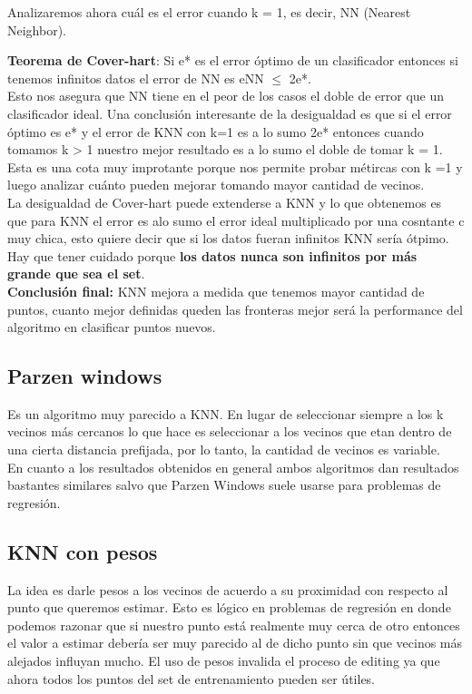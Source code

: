 \documentclass[titlepage,a4paper]{article}
\begin{document}
Analizaremos ahora cuál es el error cuando k = 1, es decir, NN (Nearest Neighbor).

\textbf{Teorema de Cover-hart}: Si e* es el error óptimo de un clasificador entonces si tenemos infinitos datos el error de NN es eNN $\leq$ 2e*. \\

Esto nos asegura que NN tiene en el peor de los casos el doble de error que un clasificador ideal. Una conclusión interesante de la desigualdad es que si el error óptimo es e* y el error de KNN con k=1 es a lo sumo 2e* entonces cuando tomamos k > 1 nuestro mejor resultado es a lo sumo el doble de tomar k = 1.   Esta es una cota muy improtante porque nos permite probar métircas con k =1 y luego analizar cuánto pueden mejorar tomando mayor cantidad de vecinos. \\

La desigualdad de Cover-hart puede extenderse a KNN y lo que obtenemos es que para KNN el error es alo sumo el error ideal multiplicado por una cosntante c muy chica, esto quiere decir que si los datos fueran infinitos KNN sería ótpimo. Hay que tener cuidado porque \textbf{los datos nunca son infinitos por más grande que sea el set}.\\

\textbf{Conclusión final:} KNN  mejora a medida que tenemos mayor cantidad de puntos, cuanto mejor definidas queden las fronteras mejor será la performance del algoritmo en clasificar puntos nuevos. \\

\subsection*{Parzen windows}
Es un algoritmo muy parecido a KNN. En lugar de seleccionar siempre a los k vecinos más cercanos lo que hace es seleccionar a los vecinos que etan dentro de una cierta distancia prefijada, por lo tanto, la cantidad de vecinos es variable. \\

En cuanto a los resultados obtenidos en general ambos algoritmos dan resultados bastantes similares salvo que Parzen Windows suele usarse para problemas de regresión. \\

\subsection*{KNN con pesos}
La idea es darle pesos a los vecinos de acuerdo a su proximidad con respecto al punto que queremos estimar. Esto es lógico en problemas de regresión en donde podemos razonar que si nuestro punto está realmente muy cerca de otro entonces el valor a estimar debería ser muy parecido al de dicho punto sin que vecinos más alejados influyan mucho. El uso de pesos invalida el proceso de editing ya que ahora todos los puntos del set de entrenamiento pueden ser útiles. \\
\end{document}
